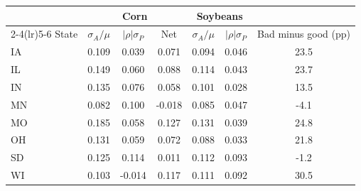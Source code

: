 \begin{tabular}{lcccccc}
\toprule
& \multicolumn{3}{c}{Corn} & \multicolumn{2}{c}{Soybeans} & \\
\cmidrule(lr){2-4}\cmidrule(lr){5-6}
State & $\sigma_A/\mu$ & $|\rho|\sigma_P$ & Net & $\sigma_A/\mu$ & $|\rho|\sigma_P$ & Bad minus good (pp)\\
\midrule
IA & 0.109 & 0.039 & 0.071 & 0.094 & 0.046 & 23.5 \\
IL & 0.149 & 0.060 & 0.088 & 0.114 & 0.043 & 23.7 \\
IN & 0.135 & 0.076 & 0.058 & 0.101 & 0.028 & 13.5 \\
MN & 0.082 & 0.100 & -0.018 & 0.085 & 0.047 & -4.1 \\
MO & 0.185 & 0.058 & 0.127 & 0.131 & 0.039 & 24.8 \\
OH & 0.131 & 0.059 & 0.072 & 0.088 & 0.033 & 21.8 \\
SD & 0.125 & 0.114 & 0.011 & 0.112 & 0.093 & -1.2 \\
WI & 0.103 & -0.014 & 0.117 & 0.111 & 0.092 & 30.5 \\
\bottomrule
\end{tabular}
